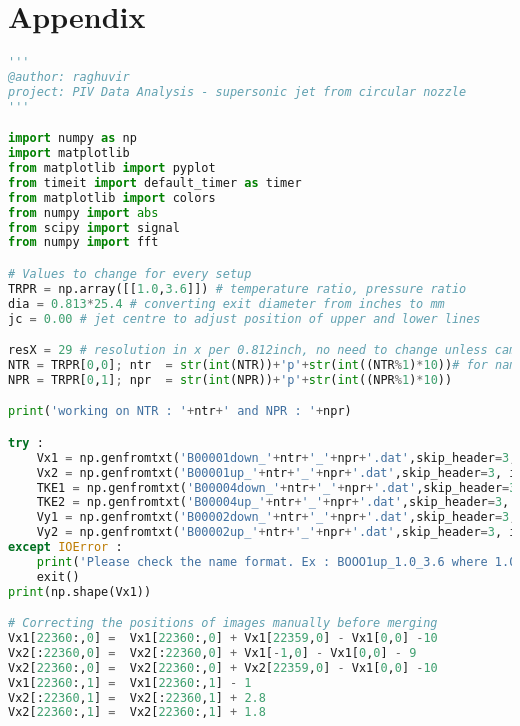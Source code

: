 
\chapter{Appendix}

\begin{lstlisting}[language=Python]
'''
@author: raghuvir
project: PIV Data Analysis - supersonic jet from circular nozzle
'''

import numpy as np
import matplotlib
from matplotlib import pyplot
from timeit import default_timer as timer
from matplotlib import colors
from numpy import abs
from scipy import signal
from numpy import fft

# Values to change for every setup
TRPR = np.array([[1.0,3.6]]) # temperature ratio, pressure ratio 
dia = 0.813*25.4 # converting exit diameter from inches to mm
jc = 0.00 # jet centre to adjust position of upper and lower lines

resX = 29 # resolution in x per 0.812inch, no need to change unless camera setup is changed
NTR = TRPR[0,0]; ntr  = str(int(NTR))+'p'+str(int((NTR%1)*10))# for naming output files
NPR = TRPR[0,1]; npr  = str(int(NPR))+'p'+str(int((NPR%1)*10))

print('working on NTR : '+ntr+' and NPR : '+npr)

try : 
    Vx1 = np.genfromtxt('B00001down_'+ntr+'_'+npr+'.dat',skip_header=3, invalid_raise=False)
    Vx2 = np.genfromtxt('B00001up_'+ntr+'_'+npr+'.dat',skip_header=3, invalid_raise=False)
    TKE1 = np.genfromtxt('B00004down_'+ntr+'_'+npr+'.dat',skip_header=3, invalid_raise=False)
    TKE2 = np.genfromtxt('B00004up_'+ntr+'_'+npr+'.dat',skip_header=3, invalid_raise=False)
    Vy1 = np.genfromtxt('B00002down_'+ntr+'_'+npr+'.dat',skip_header=3, invalid_raise=False)
    Vy2 = np.genfromtxt('B00002up_'+ntr+'_'+npr+'.dat',skip_header=3, invalid_raise=False)
except IOError :
    print('Please check the name format. Ex : BOOO1up_1.0_3.6 where 1.0 is ntr & 3.6 is npr')
    exit()
print(np.shape(Vx1))

# Correcting the positions of images manually before merging
Vx1[22360:,0] =  Vx1[22360:,0] + Vx1[22359,0] - Vx1[0,0] -10
Vx2[:22360,0] =  Vx2[:22360,0] + Vx1[-1,0] - Vx1[0,0] - 9
Vx2[22360:,0] =  Vx2[22360:,0] + Vx2[22359,0] - Vx1[0,0] -10
Vx1[22360:,1] =  Vx1[22360:,1] - 1
Vx2[:22360,1] =  Vx2[:22360,1] + 2.8
Vx2[22360:,1] =  Vx2[22360:,1] + 1.8   


\end{lstlisting}
